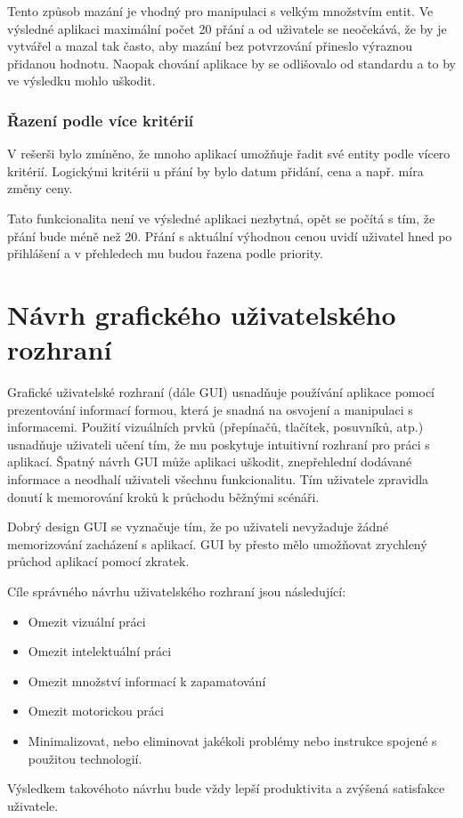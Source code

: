 Tento způsob mazání je vhodný pro manipulaci s velkým množstvím entit. Ve výsledné aplikaci maximální počet 20 přání a od uživatele se neočekává, že by je vytvářel a mazal tak často, aby mazání bez potvrzování přineslo výraznou přidanou hodnotu. Naopak chování aplikace by se odlišovalo od standardu a to by ve výsledku mohlo uškodit.

\subsubsection{Řazení podle více kritérií}
V rešerši bylo zmíněno, že mnoho aplikací umožňuje řadit své entity podle vícero kritérií. Logickými kritérii u přání by bylo datum přidání, cena a např. míra změny ceny.

Tato funkcionalita není ve výsledné aplikaci nezbytná, opět se počítá s tím, že přání bude méně než 20. Přání s aktuální výhodnou cenou uvidí uživatel hned po přihlášení a v přehledech mu budou řazena podle priority.

\section{Návrh grafického uživatelského rozhraní}
\label{sec:navrh-gui}
Grafické uživatelské rozhraní (dále GUI) usnadňuje používání aplikace pomocí prezentování informací formou, která je snadná na osvojení a manipulaci s informacemi. Použití vizuálních prvků (přepínačů, tlačítek, posuvníků, atp.) usnadňuje uživateli učení tím, že mu poskytuje intuitivní rozhraní pro práci s aplikací. Špatný návrh GUI může aplikaci uškodit, znepřehlední dodávané informace a neodhalí uživateli všechnu funkcionalitu. Tím uživatele zpravidla donutí k memorování kroků k průchodu běžnými scénáři\cite{toby2001expgui}.

Dobrý design GUI se vyznačuje tím, že po uživateli nevyžaduje žádné memorizování zacházení s aplikací. GUI by přesto mělo umožňovat zrychlený průchod aplikací pomocí zkratek\cite{toby2001expgui}.

Cíle správného návrhu uživatelského rozhraní jsou následující\cite{galitz2007essential}:
\begin{itemize}
\item Omezit vizuální práci
\item Omezit intelektuální práci
\item Omezit množství informací k zapamatování
\item Omezit motorickou práci
\item Minimalizovat, nebo eliminovat jakékoli problémy nebo instrukce spojené s použitou technologií.
\end{itemize}
Výsledkem takovéhoto návrhu bude vždy lepší produktivita a zvýšená satisfakce uživatele\cite{galitz2007essential}.

